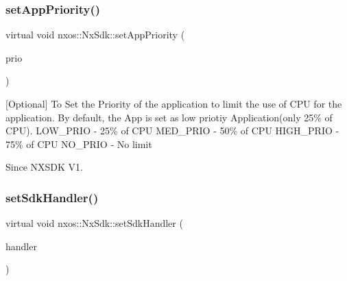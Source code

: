 \subsubsection{\texorpdfstring{set\+App\+Priority()}{setAppPriority()}}
{\footnotesize\ttfamily virtual void nxos\+::\+Nx\+Sdk\+::set\+App\+Priority (\begin{DoxyParamCaption}\item[{\mbox{\hyperlink{nx__common_8h_af446a76676837368bde9b15343ae21d5}{nxos\+::prio\+\_\+e}}}]{prio }\end{DoxyParamCaption})\hspace{0.3cm}{\ttfamily [pure virtual]}}

\mbox{[}Optional\mbox{]} To Set the Priority of the application to limit the use of C\+PU for the application. By default, the App is set as low priotiy Application(only 25\% of C\+PU). L\+O\+W\+\_\+\+P\+R\+IO -\/ 25\% of C\+PU M\+E\+D\+\_\+\+P\+R\+IO -\/ 50\% of C\+PU H\+I\+G\+H\+\_\+\+P\+R\+IO -\/ 75\% of C\+PU N\+O\+\_\+\+P\+R\+IO -\/ No limit

\begin{DoxySince}{Since}
N\+X\+S\+DK V1. 
\end{DoxySince}
\mbox{\label{classnxos_1_1_nx_sdk_a5f14e71747eac4fd5703d0cb490abe89}} 
\subsubsection{\texorpdfstring{set\+Sdk\+Handler()}{setSdkHandler()}}
{\footnotesize\ttfamily virtual void nxos\+::\+Nx\+Sdk\+::set\+Sdk\+Handler (\begin{DoxyParamCaption}\item[{\mbox{\hyperlink{classnxos_1_1_nx_sdk_handler}{Nx\+Sdk\+Handler}} $\ast$}]{handler }\end{DoxyParamCaption})\hspace{0.3cm}{\ttfamily [pure virtual]}}

